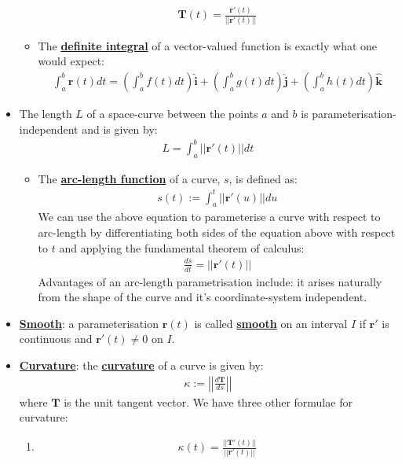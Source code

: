 \documentclass[reqno,11pt]{amsart}
\theoremstyle{definition}
\theoremstyle{remark}
\newcommand{\dfn}[1]{\underline{\textbf{#1}}}
\begin{document}
\begin{itemize}[noitemsep]
\begin{itemize}
\begin{align}
				\mathbf{T}(t) = \frac{\mathbf{r}'(t)}{|| \mathbf{r}'(t) ||}
		\end{align}
		\item The \dfn{definite integral} of a vector-valued function is exactly what one would expect: 
		\begin{align}
			\int_a^b \mathbf{r}(t) dt = \left( \int_a^b f(t) dt \right) \mathbf{\hat{i}} + \left( \int_a^b g(t) dt \right) \mathbf{\hat{j}} + \left( \int_a^b h(t) dt \right) \mathbf{\hat{k}}  
		\end{align}
	\end{itemize}
	\item The length $L$ of a space-curve between the points $a$ and $b$ is parameterisation-independent and is given by:
	\begin{align}
		L = \int_a^b || \mathbf{r}'(t) || dt 	
	\end{align}
	\begin{itemize}[noitemsep]
		\item The \dfn{arc-length function} of a curve, $s$, is defined as: 
		\begin{align}
			s(t) := \int_a^t || \mathbf{r}'(u) || du 	
		\end{align}
		We can use the above equation to parameterise a curve with respect to arc-length by differentiating both sides of the equation above with respect to $t$ and applying the fundamental theorem of calculus: 
		\begin{align}
			\frac{ds}{dt} = || \mathbf{r}'(t) ||	
		\end{align}
		Advantages of an arc-length parametrisation include: it arises naturally from the shape of the curve and it's coordinate-system independent. 
	\end{itemize}
	\item \dfn{Smooth}: a parameterisation $\mathbf{r}(t)$ is called \dfn{smooth} on an interval $I$ if $\mathbf{r}'$ is continuous and $\mathbf{r}'(t) \neq 0$ on $I$. 
	\item \dfn{Curvature}: the \dfn{curvature} of a curve is given by: 
	\begin{align}
		\kappa := \left| \left| \frac{d \mathbf{T}}{ds} \right| \right| 	
	\end{align}
	where $\mathbf{T}$ is the unit tangent vector. We have three other formulae for curvature: 
	\begin{enumerate}[noitemsep]
		\item 
		\begin{align}
			\kappa(t) = \frac{|| \mathbf{T}'(t) ||}{|| \mathbf{r}'(t) ||}	

\end{align}
\end{enumerate}
\end{itemize}
\end{document}
